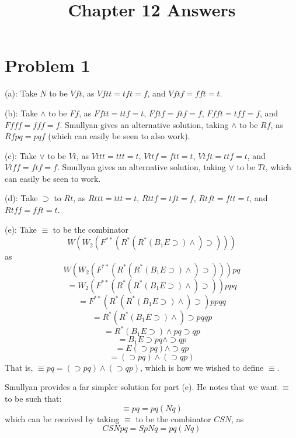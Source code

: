 \documentclass{article}
\title{Chapter 12 Answers}
\theoremstyle{definition}
\begin{document}
\date{}
\maketitle

\section*{Problem 1}
(a): Take $N$ to be $Vft$, as $Vftt=tft=f$, and $Vftf=fft=t$.


(b): Take $\wedge$ to be $Ff$, as $Fftt=ttf=t$, $Fftf=ftf=f$, $Ffft=tff=f$, and $Ffff=fff=f$. Smullyan gives an alternative solution, taking $\wedge$ to be $Rf$, as 
$Rfpq=pqf$ (which can easily be seen to also work).


(c): Take $\vee$ to be $Vt$, as $Vttt=ttt=t$, $Vttf=ftt=t$, $Vtft=ttf=t$, and $Vtff=ftf=f$. Smullyan gives an alternative solution, taking $\vee$ to be $Tt$, which can easily be seen to work.


(d): Take $\supset$ to $Rt$, as $Rttt=ttt=t$, $Rttf=tft=f$, $Rtft=ftt=t$, and $Rtff=fft=t$.


(e): Take $\equiv$ to be the combinator \[ W(W_2(F^{**}(R^*(R^*(B_1E\supset )\wedge )\supset ))) \]
as \[ W(W_2(F^{**}(R^*(R^*(B_1E\supset )\wedge )\supset )))pq \]
\[ =W_2(F^{**}(R^*(R^*(B_1E\supset )\wedge )\supset ))ppq \]
\[ =F^{**}(R^*(R^*(B_1E\supset )\wedge )\supset )ppqq \]
\[ =R^*(R^*(B_1E\supset )\wedge )\supset pqqp \]
\[ =R^*(B_1E\supset )\wedge pq\supset qp \]
\[ =B_1E\supset pq\wedge\supset qp \]
\[ =E(\supset pq)\wedge\supset qp \]
\[ =(\supset pq)\wedge(\supset qp) \]
That is, $\equiv pq=(\supset pq)\wedge(\supset qp)$, which is how we wished to define $\equiv$.


Smullyan provides a far simpler solution for part (e). He notes that we want $\equiv$ to be such that:
\[ \equiv pq=pq(Nq) \] which can be received by taking $\equiv$ to be the combinator $CSN$, as
\[ CSNpq=SpNq=pq(Nq) \]
\end{document}

